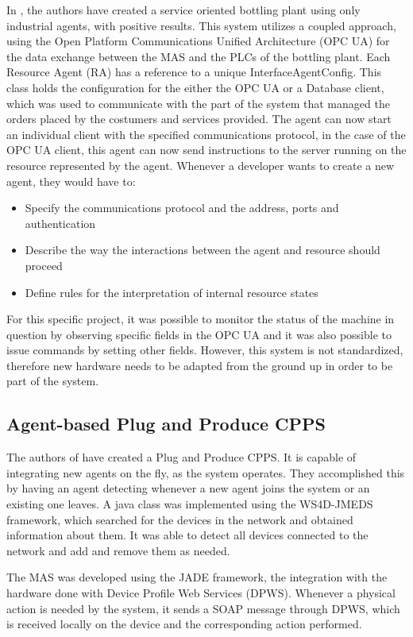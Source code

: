 In \cite{marschall01}, the authors have created a service oriented bottling plant using only industrial agents, with positive results. This system utilizes a coupled approach, using the Open Platform Communications Unified Architecture (OPC UA) for the data exchange between the MAS and the PLCs of the bottling plant. Each Resource Agent (RA) has a reference to a unique InterfaceAgentConfig. This class holds the configuration for the either the OPC UA or a Database client, which was used to communicate with the part of the system that managed the orders placed by the costumers and services provided. The agent can now start an individual client with the specified communications protocol, in the case of the OPC UA client, this agent can now send instructions to the server running on the resource represented by the agent.
Whenever a developer wants to create a new agent, they would have to:
\begin{itemize}
	\item Specify the communications protocol and the address, ports and authentication
	\item Describe the way the interactions between the agent and resource should proceed
	\item Define rules for the interpretation of internal resource states
\end{itemize}

For this specific project, it was possible to monitor the status of the machine in question by observing specific fields in the OPC UA and it was also possible to issue commands by setting other fields. However, this system is not standardized, therefore new hardware needs to be adapted from the ground up in order to be part of the system.
 
\subsection{Agent-based Plug and Produce CPPS}

The authors of \cite{8972169} have created a Plug and Produce CPPS. It is capable of integrating new agents on the fly, as the system operates. They accomplished this by having an agent detecting whenever a new agent joins the system or an existing one leaves. A java class was implemented using the WS4D-JMEDS framework, which searched for the devices in the network and obtained information about them. It was able to detect all devices connected to the network and add and remove them as needed.

The MAS was developed using the JADE framework, the integration with the hardware done with Device Profile Web Services (DPWS). Whenever a physical action is needed by the system, it sends a SOAP message through DPWS, which is received locally on the device and the corresponding action performed.


